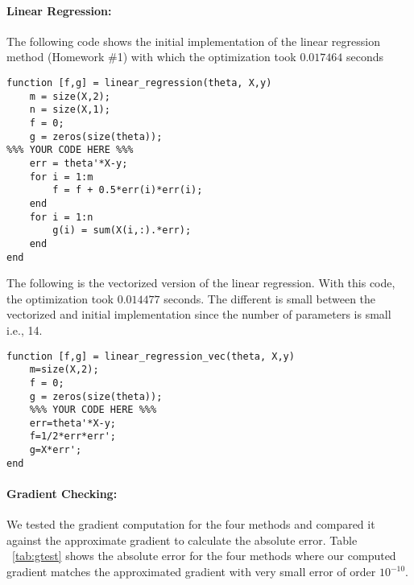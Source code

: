 \documentclass[12pt] {article}
\begin{document}
\paragraph{Linear Regression:}
The following code shows the initial implementation of the linear regression method (Homework \#1) with which the optimization took $0.017464$ seconds

\begin{lstlisting}
function [f,g] = linear_regression(theta, X,y)
	m = size(X,2);
	n = size(X,1);
	f = 0;
	g = zeros(size(theta));
%%% YOUR CODE HERE %%%
    err = theta'*X-y;
    for i = 1:m
        f = f + 0.5*err(i)*err(i);
    end
    for i = 1:n
        g(i) = sum(X(i,:).*err);
    end   
end
\end{lstlisting}

The following is the vectorized version of the linear regression. With this code, the optimization took $0.014477$ seconds. The different is small between the vectorized and initial implementation since the number of parameters is small i.e., 14. 

\begin{lstlisting}
function [f,g] = linear_regression_vec(theta, X,y)
	m=size(X,2);  
	f = 0;
	g = zeros(size(theta));  
	%%% YOUR CODE HERE %%%
	err=theta'*X-y;
	f=1/2*err*err';
	g=X*err';
end
\end{lstlisting}
\newpage

\paragraph{Gradient Checking:}
We tested the gradient computation for the four methods and compared it against the approximate gradient to calculate the absolute error. Table ~\ref{tab:gtest} shows the absolute error for the four methods where our computed gradient matches the approximated gradient with very small error of order $10^{-10}$.
\end{document}
